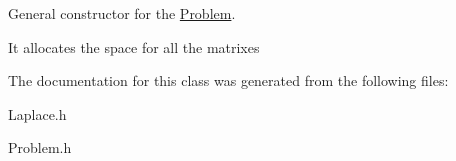 General constructor for the \hyperlink{class_problem}{Problem}. 

It allocates the space for all the matrixes 

The documentation for this class was generated from the following files\+:\begin{DoxyCompactItemize}
\item 
Laplace.\+h\item 
Problem.\+h\end{DoxyCompactItemize}
